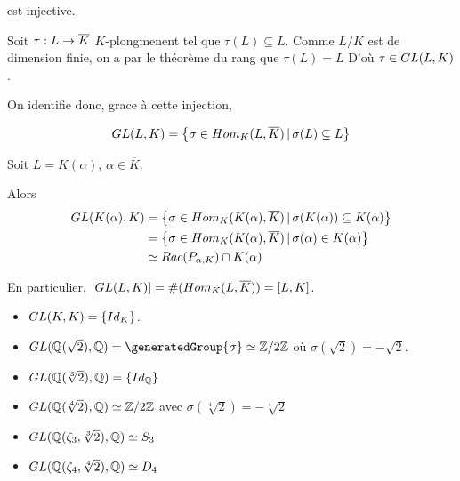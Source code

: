 est injective.

Soit $\tau : L \rightarrow \overline{K}$ $K$-plongmenent tel que $\tau(L)
\subseteq L$. Comme $L/K$ est de dimension finie, on a par le théorème du rang
que $\tau(L) = L$
D'où $\tau \in GL(L, K)$.

On identifie donc, grace à cette injection,

\begin{equation*}
	GL(L, K) = \left\{\sigma \in
	Hom_{K}(L, \overline{K}) \, | \, \sigma(L) \subseteq L \right\}
\end{equation*}

\begin{exemple}
	Soit $L = K(\alpha)$, $\alpha \in \overline{K}$.

	Alors
	\begin{align*}
		GL(K(\alpha), K)
		& = \left\{\sigma \in
			Hom_{K}(K(\alpha), \overline{K}) \, | \, \sigma(K(\alpha)) \subseteq
			K(\alpha) \right\} \\
		& = \left\{\sigma \in
			Hom_{K}(K(\alpha), \overline{K}) \, | \, \sigma(\alpha) \in
			K(\alpha) \right\} \\
		& \simeq Rac(P_{\alpha, K}) \cap K(\alpha)
	\end{align*}

	En particulier, $|GL(L, K)| =
	\#(Hom_{K}(L, \overline{K})) = [L, K]$.
\end{exemple}

\begin{exemple} [Exercice]
	\begin{itemize}
		\item $GL(K, K) = \left\{ Id_{K} \right\}$.
		\item $\galoisGroup{\rational(\sqrt{2})}{\rational} =
			\generatedGroup{\sigma} \isomorph
			\integer/2\integer$ où $\sigma(\sqrt{2}) = - \sqrt{2}$.
		\item $GL(\mathbb{Q}(\sqrt[3]{2}), \mathbb{Q}) =
			\left\{ Id_{\mathbb{Q}} \right\}$
		\item $GL(\mathbb{Q}(\sqrt[4]{2}), \mathbb{Q}) \simeq
			\mathbb{Z}/2\mathbb{Z}$ avec $\sigma(\sqrt[4]{2}) = - \sqrt[4]{2}$
		\item $GL(\mathbb{Q}(\zeta_{3}, \sqrt[3]{2}), \mathbb{Q})
			\simeq S_{3}$
		\item $GL(\mathbb{Q}(\zeta_{4}, \sqrt[4]{2}), \mathbb{Q})
			\simeq D_{4}$
	\end{itemize}
\end{exemple}

